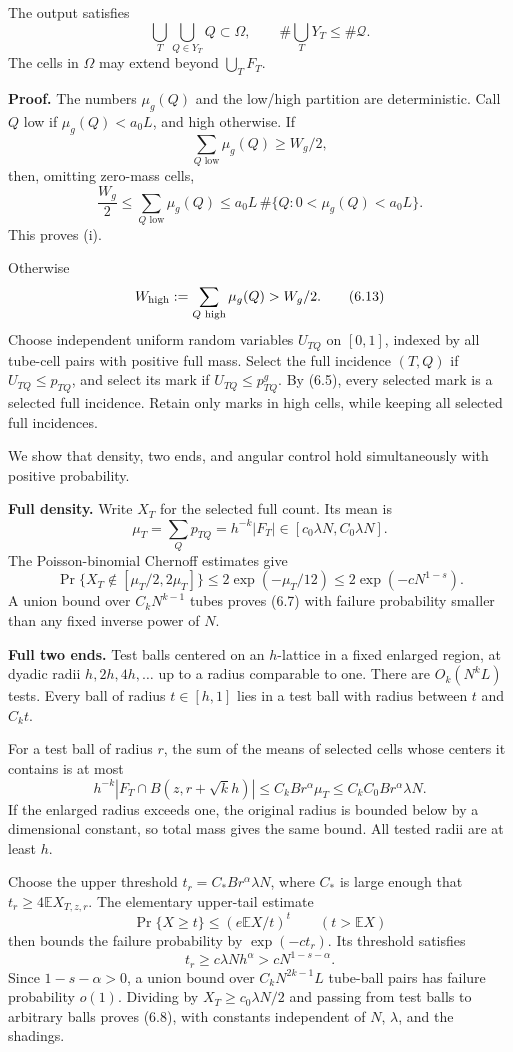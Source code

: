 \documentclass[
  11pt,
  a4paper,
]{article}
\begin{document}
The output satisfies \[\bigcup_T\bigcup_{Q\in Y_T}Q\subset\Omega,
 \qquad
 \#\bigcup_TY_T\le\#\mathcal Q.
 \tag{6.11}\label{eq:6.11}\] The cells in \(\Omega\) may extend beyond
\(\bigcup_TF_T\).

\textbf{Proof.} The numbers \(\mu_g(Q)\) and the low/high partition are
deterministic. Call \(Q\) low if \(\mu_g(Q)<a_0L\), and high otherwise.
If \[\sum_{Q\text{ low}}\mu_g(Q)\ge W_g/2,\] then, omitting zero-mass
cells, \[\frac{W_g}{2}
 \le\sum_{Q\text{ low}}\mu_g(Q)
 \le a_0L\,\#\{Q:0<\mu_g(Q)<a_0L\}.
 \tag{6.12}\label{eq:6.12}\] This proves (i).

Otherwise \[W_{\rm high}:=\sum_{Q\text{ high}}\mu_g(Q)>W_g/2.
 \tag{6.13}\label{eq:6.13}\] Choose independent uniform random variables \(U_{TQ}\) on
\([0,1]\), indexed by all tube-cell pairs with positive full mass.
Select the full incidence \((T,Q)\) if \(U_{TQ}\le p_{TQ}\), and select
its mark if \(U_{TQ}\le p^g_{TQ}\). By (6.5), every selected mark is a
selected full incidence. Retain only marks in high cells, while keeping
all selected full incidences.

We show that density, two ends, and angular control hold simultaneously
with positive probability.

\textbf{Full density.} Write \(X_T\) for the selected full count. Its
mean is
\[\mu_T=\sum_Qp_{TQ}=h^{-k}|F_T|\in[c_0\lambda N,C_0\lambda N].\] The
Poisson-binomial Chernoff estimates give
\[\Pr\{X_T\notin[\mu_T/2,2\mu_T]\}
 \le2\exp(-\mu_T/12)
 \le2\exp(-cN^{1-s}).
 \tag{6.14}\label{eq:6.14}\] A union bound over \(C_kN^{k-1}\) tubes proves (6.7) with
failure probability smaller than any fixed inverse power of \(N\).

\textbf{Full two ends.} Test balls centered on an \(h\)-lattice in a
fixed enlarged region, at dyadic radii \(h,2h,4h,\ldots\) up to a radius
comparable to one. There are \(O_k(N^kL)\) tests. Every ball of radius
\(t\in[h,1]\) lies in a test ball with radius between \(t\) and
\(C_kt\).

For a test ball of radius \(r\), the sum of the means of selected cells
whose centers it contains is at most \[h^{-k}|F_T\cap B(z,r+\sqrt{k}h)|
 \le C_k B r^\alpha\mu_T
 \le C_k C_0B r^\alpha\lambda N.
 \tag{6.15}\label{eq:6.15}\] If the enlarged radius exceeds one, the original radius is
bounded below by a dimensional constant, so total mass gives the same
bound. All tested radii are at least \(h\).

Choose the upper threshold \(t_r=C_*B r^\alpha\lambda N\), where \(C_*\)
is large enough that \(t_r\ge4\mathbb E X_{T,z,r}\). The elementary
upper-tail estimate \[\Pr\{X\ge t\}\le(e\mathbb EX/t)^t
 \qquad(t>\mathbb EX)\] then bounds the failure probability by
\(\exp(-c t_r)\). Its threshold satisfies \[t_r\ge c\lambda N h^\alpha
 >cN^{1-s-\alpha}.
 \tag{6.16}\label{eq:6.16}\] Since \(1-s-\alpha>0\), a union bound over
\(C_kN^{2k-1}L\) tube-ball pairs has failure probability \(o(1)\).
Dividing by \(X_T\ge c_0\lambda N/2\) and passing from test balls to
arbitrary balls proves (6.8), with constants independent of \(N\),
\(\lambda\), and the shadings.
\end{document}
